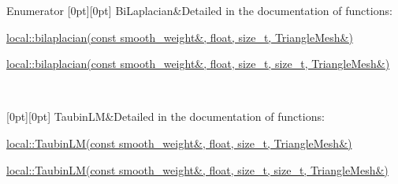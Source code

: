 \begin{DoxyEnumFields}{Enumerator}
[0pt][0pt]{}\mbox{\label{namespacegeoproc_1_1smoothing_a64c2bfd1dda6cfbf39afa2e61fd62537a0890724bffb79f511bc768c0529dce3f}} 
Bi\+Laplacian&Detailed in the documentation of functions\+:
\begin{DoxyItemize}
\item \hyperlink{namespacegeoproc_1_1smoothing_1_1local_a5958a9bdf688836bd6242de213a68ec4}{local\+::bilaplacian(const smooth\+\_\+weight\&, float, size\+\_\+t, Triangle\+Mesh\&)}
\item \hyperlink{namespacegeoproc_1_1smoothing_1_1local_a7c96dc664c1900b1cba6d3a3eb2547d7}{local\+::bilaplacian(const smooth\+\_\+weight\&, float, size\+\_\+t, size\+\_\+t, Triangle\+Mesh\&)} 
\end{DoxyItemize}\\
\hline

[0pt][0pt]{}\mbox{\label{namespacegeoproc_1_1smoothing_a64c2bfd1dda6cfbf39afa2e61fd62537ad69ec4945f39affa518f05fa077b00ae}} 
Taubin\+LM&Detailed in the documentation of functions\+:
\begin{DoxyItemize}
\item \hyperlink{namespacegeoproc_1_1smoothing_1_1local_acb46f51bf5fefe33b36ae6d7e0c4a899}{local\+::\+Taubin\+L\+M(const smooth\+\_\+weight\&, float, size\+\_\+t, Triangle\+Mesh\&)}
\item \hyperlink{namespacegeoproc_1_1smoothing_1_1local_ae68c255cdba405972ce42238aee04c3b}{local\+::\+Taubin\+L\+M(const smooth\+\_\+weight\&, float, size\+\_\+t, size\+\_\+t, Triangle\+Mesh\&)} 
\end{DoxyItemize}\\
\hline

\end{DoxyEnumFields}
\mbox{\label{namespacegeoproc_1_1smoothing_a76e43f405426c150569712512de58028}} 
